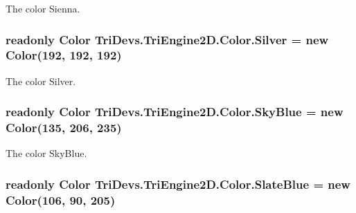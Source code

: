 The color Sienna. 

\hypertarget{struct_tri_devs_1_1_tri_engine2_d_1_1_color_a00bfc238fedd090788bf19b682dd734e}{
\subsubsection[{Silver}]{\setlength{\rightskip}{0pt plus 5cm}readonly {\bf Color} Tri\-Devs.\-Tri\-Engine2\-D.\-Color.\-Silver = new {\bf Color}(192, 192, 192)\hspace{0.3cm}{\ttfamily [static]}}}\label{struct_tri_devs_1_1_tri_engine2_d_1_1_color_a00bfc238fedd090788bf19b682dd734e}


The color Silver. 

\hypertarget{struct_tri_devs_1_1_tri_engine2_d_1_1_color_ad049225cef59cc367954411fe01965ec}{
\subsubsection[{Sky\-Blue}]{\setlength{\rightskip}{0pt plus 5cm}readonly {\bf Color} Tri\-Devs.\-Tri\-Engine2\-D.\-Color.\-Sky\-Blue = new {\bf Color}(135, 206, 235)\hspace{0.3cm}{\ttfamily [static]}}}\label{struct_tri_devs_1_1_tri_engine2_d_1_1_color_ad049225cef59cc367954411fe01965ec}


The color Sky\-Blue. 

\hypertarget{struct_tri_devs_1_1_tri_engine2_d_1_1_color_a014c51e43b07b4a32af7a2fd0e4abc4e}{
\subsubsection[{Slate\-Blue}]{\setlength{\rightskip}{0pt plus 5cm}readonly {\bf Color} Tri\-Devs.\-Tri\-Engine2\-D.\-Color.\-Slate\-Blue = new {\bf Color}(106, 90, 205)\hspace{0.3cm}{\ttfamily [static]}}}\label{struct_tri_devs_1_1_tri_engine2_d_1_1_color_a014c51e43b07b4a32af7a2fd0e4abc4e}


